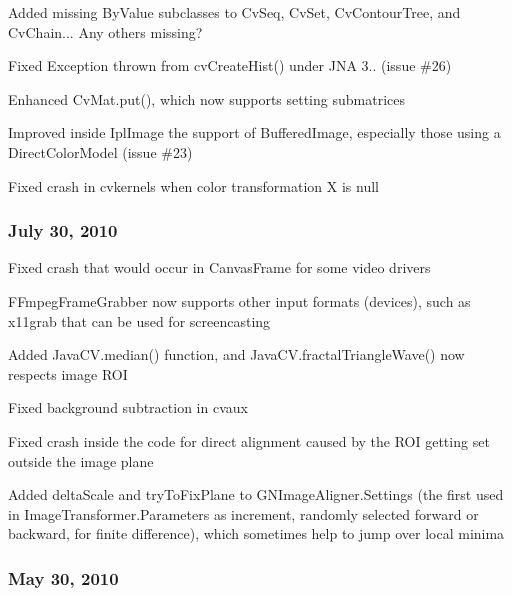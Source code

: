 \begin{DoxyItemize}
\item Added missing {\ttfamily By\+Value} subclasses to {\ttfamily Cv\+Seq}, {\ttfamily Cv\+Set}, {\ttfamily Cv\+Contour\+Tree}, and {\ttfamily Cv\+Chain}... Any others missing?
\item Fixed {\ttfamily Exception} thrown from {\ttfamily cv\+Create\+Hist()} under J\+N\+A 3.. (issue \#26)
\item Enhanced {\ttfamily Cv\+Mat.\+put()}, which now supports setting submatrices
\item Improved inside {\ttfamily Ipl\+Image} the support of {\ttfamily Buffered\+Image}, especially those using a {\ttfamily Direct\+Color\+Model} (issue \#23)
\item Fixed crash in {\ttfamily cvkernels} when color transformation {\ttfamily X} is {\ttfamily null}
\end{DoxyItemize}

\subsubsection*{July 30, 2010}


\begin{DoxyItemize}
\item Fixed crash that would occur in {\ttfamily Canvas\+Frame} for some video drivers
\item {\ttfamily F\+Fmpeg\+Frame\+Grabber} now supports other input formats (devices), such as {\ttfamily x11grab} that can be used for screencasting
\item Added {\ttfamily Java\+C\+V.\+median()} function, and {\ttfamily Java\+C\+V.\+fractal\+Triangle\+Wave()} now respects image R\+O\+I
\item Fixed background subtraction in {\ttfamily cvaux}
\item Fixed crash inside the code for direct alignment caused by the R\+O\+I getting set outside the image plane
\item Added {\ttfamily delta\+Scale} and {\ttfamily try\+To\+Fix\+Plane} to {\ttfamily G\+N\+Image\+Aligner.\+Settings} (the first used in {\ttfamily Image\+Transformer.\+Parameters} as increment, randomly selected forward or backward, for finite difference), which sometimes help to jump over local minima
\end{DoxyItemize}

\subsubsection*{May 30, 2010}


